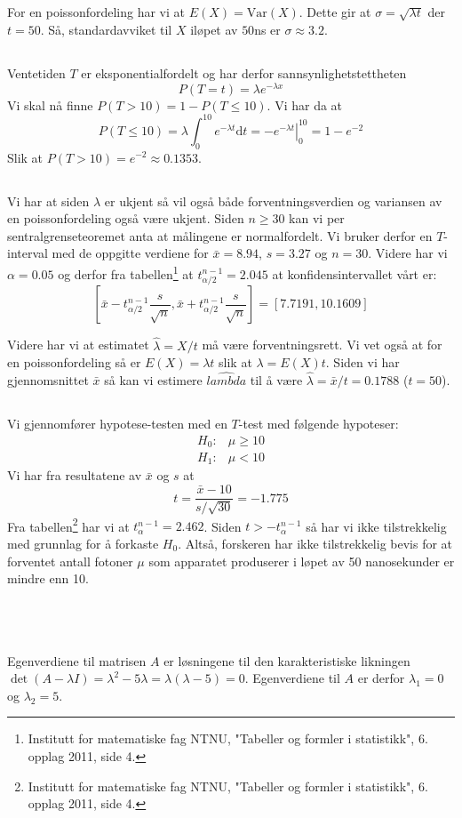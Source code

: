 \documentclass[12pt, a4paper,norsk]{article}
\newcommand{\oppgave}{\,\section{}}
\newcommand{\deloppgave}{\subsection{}}
\newcommand{\confidence}[3]{\left[#1 - #2_{\alpha/2} #3, #1 + #2_{\alpha/2} #3\right]}
\newcommand{\prob}[1]{P\left(#1\right)}
\newcommand{\var}[1]{\mathrm{Var}\left(#1\right)}
\newcommand{\expected}[1]{E\left(#1\right)}
\newcommand{\score}[3]{\frac{#1 - #2}{#3}}
\newcommand{\dd}{\mathrm{d}}
\newcommand{\tabell}[1]{\footnote{
	Institutt for matematiske fag NTNU,
	"Tabeller og formler i statistikk", 
	6. opplag 2011, side #1.}}
\begin{document}
	\deloppgave
	For en poissonfordeling har vi at $\expected{X} = \var{X}$. Dette gir at $\sigma = \sqrt{\lambda t}$ der $t = 50$. Så, standardavviket til $X$ iløpet av $50$ns er $\sigma \approx 3.2$.
	
	\deloppgave
	Ventetiden $T$ er eksponentialfordelt og har derfor sannsynlighetstettheten
	$$
	\prob{T = t} = \lambda e^{-\lambda x}
	$$
	Vi skal nå finne $\prob{T > 10} = 1 - \prob{T \leq 10}$. Vi har da at
	$$
	\prob{T \leq 10} = \lambda\int_{0}^{10} e^{-\lambda t} \dd t= \left. -e^{-\lambda t}\right|_{0}^{10} = 1 - e^{-2}
	$$
	Slik at $\prob{T > 10} = e^{-2} \approx 0.1353$.
	
	\deloppgave
	Vi har at siden $\lambda$ er ukjent så vil også både forventningsverdien og variansen av en poissonfordeling også være ukjent. Siden $n \geq 30$ kan vi per sentralgrenseteoremet anta at målingene er normalfordelt. Vi bruker derfor en $T$-interval med de oppgitte verdiene for $\bar{x} = 8.94$, $s = 3.27$ og $n = 30$. Videre har vi $\alpha = 0.05$ og derfor fra tabellen\tabell{4} at $t_{\alpha/2}^{n-1} = 2.045$ at konfidensintervallet vårt er:
	$$
	\confidence{\bar{x}}{t^{n-1}}{\frac{s}{\sqrt{n}}} = [7.7191, 10.1609]
	$$
	
	Videre har vi at estimatet $\hat{\lambda} = X/t$ må være forventningsrett. Vi vet også at for en poissonfordeling så er $\expected{X} = \lambda t$ slik at $\lambda = \expected{X}{t}$. Siden vi har gjennomsnittet $\bar{x}$ så kan vi estimere $\hat{lambda}$ til å være $\hat{\lambda} = \bar{x}/t = 0.1788$ ($t = 50$).
	
	\deloppgave
	Vi gjennomfører hypotese-testen med en $T$-test med følgende hypoteser:
	\begin{align}
		H_0\colon & \mu \geq 10\\
		H_1\colon & \mu < 10
	\end{align}
	Vi har fra resultatene av $\bar{x}$ og $s$ at 
	$$
	t = \score{\bar{x}}{10}{s/\sqrt{30}} = -1.775
	$$
	Fra tabellen\tabell{4} har vi at $t_{\alpha}^{n-1} = 2.462$. Siden $t > -t_{\alpha}^{n-1}$ så har vi ikke tilstrekkelig med grunnlag for å forkaste $H_0$. Altså, forskeren har ikke tilstrekkelig bevis for at  forventet antall fotoner $\mu$ som apparatet produserer i løpet av 50
	nanosekunder er mindre enn 10.
	
	\oppgave
	\deloppgave
	Egenverdiene til matrisen $A$ er løsningene til den karakteristiske likningen $\det(A - \lambda I) = \lambda^2 - 5\lambda = \lambda(\lambda - 5) = 0$. Egenverdiene til $A$ er derfor $\lambda_1 = 0$ og $\lambda_2 = 5$. 
	
\end{document}
